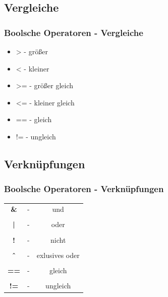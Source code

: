 \documentclass[final]{beamer}
\begin{document}
\subsection{Vergleiche}
\begin{frame}
	\frametitle{Boolsche Operatoren - Vergleiche}
	\begin{itemize}
		\item{>  - größer}
		\item{<  - kleiner}
		\item{>= - größer gleich}
		\item{<= - kleiner gleich}
		\item{== - gleich}
		\item{!= - ungleich}
	\end{itemize}
\end{frame}

\subsection{Verknüpfungen}
\begin{frame}
	\frametitle{Boolsche Operatoren - Verknüpfungen}
	\begin{tabular}{c c c}
		\textbf{\&}  & - & und \\&&\\
		\textbf{|} & - & oder \\&&\\
		\textbf{!} & - & nicht \\&&\\
		\textbf{\^\ }  & - &  exlusives oder \\&&\\
		\textbf{==} & - & gleich \\&&\\
		\textbf{!=} & - & ungleich \\
	\end{tabular}
	\
\end{frame}
\end{document}
